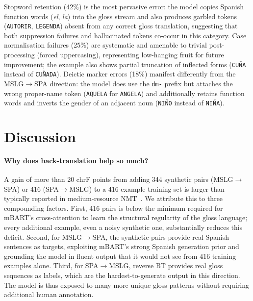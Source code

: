 \documentclass[sigconf,screen]{ceurart}
\begin{document}
Stopword retention (42\%) is the most pervasive error: the model
copies Spanish function words (\textit{el}, \textit{la}) into the
gloss stream and also produces garbled tokens (\texttt{AUTORIR},
\texttt{LEGENDA}) absent from any correct gloss translation, suggesting
that both suppression failures and hallucinated tokens co-occur in
this category.
Case normalisation failures (25\%) are systematic and amenable to
trivial post-processing (forced uppercasing), representing low-hanging
fruit for future improvement; the example also shows partial truncation
of inflected forms (\texttt{CU\~NA} instead of \texttt{CU\~NADA}).
Deictic marker errors (18\%) manifest differently from the MSLG$\to$SPA
direction: the model does use the \texttt{dm-} prefix but attaches the
wrong proper-name token (\texttt{AQUELA} for \texttt{ANGELA}) and
additionally retains function words and inverts the gender of an
adjacent noun (\texttt{NI\~NO} instead of \texttt{NI\~NA}).

\section{Discussion}
\label{sec:discussion}

\paragraph{Why does back-translation help so much?}
A gain of more than 20 chrF points from adding 344 synthetic pairs
(MSLG$\!\to\!$SPA) or 416 (SPA$\!\to\!$MSLG) to a 416-example
training set is larger than typically reported in medium-resource
NMT~\cite{edunov2018bt}.
We attribute this to three compounding factors.
First, 416 pairs is below the minimum required for mBART's cross-attention
to learn the structural regularity of the gloss language; every
additional example, even a noisy synthetic one, substantially reduces
this deficit.
Second, for MSLG$\!\to\!$SPA, the synthetic pairs provide real Spanish
sentences as targets, exploiting mBART's strong Spanish generation
prior and grounding the model in fluent output that it would not see
from 416 training examples alone.
Third, for SPA$\!\to\!$MSLG, reverse BT provides real gloss sequences
as labels, which are the hardest-to-generate output in this direction.
The model is thus exposed to many more unique gloss patterns without
requiring additional human annotation.
\end{document}
